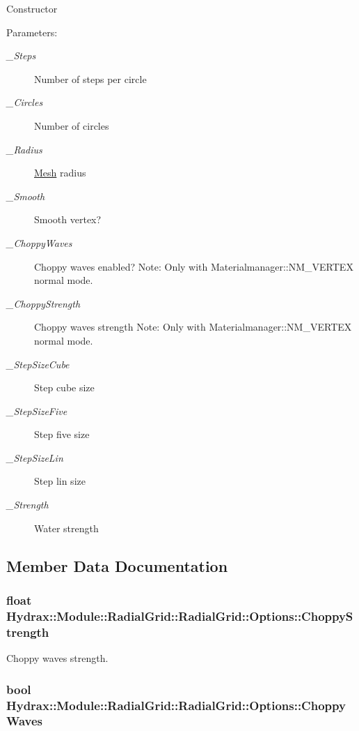 Constructor \begin{Desc}
\item[Parameters:]
\begin{description}
\item[{\em \_\-Steps}]Number of steps per circle \item[{\em \_\-Circles}]Number of circles \item[{\em \_\-Radius}]\hyperlink{class_hydrax_1_1_mesh}{Mesh} radius \item[{\em \_\-Smooth}]Smooth vertex? \item[{\em \_\-ChoppyWaves}]Choppy waves enabled? Note: Only with Materialmanager::NM\_\-VERTEX normal mode. \item[{\em \_\-ChoppyStrength}]Choppy waves strength Note: Only with Materialmanager::NM\_\-VERTEX normal mode. \item[{\em \_\-StepSizeCube}]Step cube size \item[{\em \_\-StepSizeFive}]Step five size \item[{\em \_\-StepSizeLin}]Step lin size \item[{\em \_\-Strength}]Water strength \end{description}
\end{Desc}


\subsection{Member Data Documentation}
\hypertarget{struct_hydrax_1_1_module_1_1_radial_grid_1_1_options_bc3d5ce9e689f4ae7eacf517c25a7c78}{
\subsubsection[{ChoppyStrength}]{\setlength{\rightskip}{0pt plus 5cm}float Hydrax::Module::RadialGrid::RadialGrid::Options::ChoppyStrength}}
\label{struct_hydrax_1_1_module_1_1_radial_grid_1_1_options_bc3d5ce9e689f4ae7eacf517c25a7c78}


Choppy waves strength. 

\hypertarget{struct_hydrax_1_1_module_1_1_radial_grid_1_1_options_8f2d48d2bc30eaa1862696aadacd9241}{
\subsubsection[{ChoppyWaves}]{\setlength{\rightskip}{0pt plus 5cm}bool Hydrax::Module::RadialGrid::RadialGrid::Options::ChoppyWaves}}
\label{struct_hydrax_1_1_module_1_1_radial_grid_1_1_options_8f2d48d2bc30eaa1862696aadacd9241}


